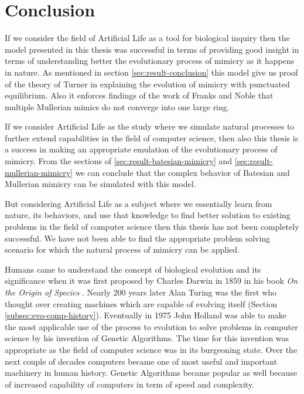\chapter{Conclusion}
If we consider the field of Artificial Life as a tool for biological inquiry then the model presented in this thesis was successful in terms of providing good insight in terms of understanding better the evolutionary process of mimicry as it happens in nature. As mentioned in section \ref{sec:result-conclusion} this model give us proof of the theory of Turner in explaining the evolution of mimicry with punctuated equilibrium. Also it enforces findings of the work of Franks and Noble that multiple Mullerian mimics do not converge into one large ring.

If we consider Artificial Life as the study where we simulate natural processes to further extend capabilities in the field of computer science, then also this thesis is a success in making an appropriate emulation of the evolutionary process of mimicry. From the sections of \ref{sec:result-batesian-mimicry} and \ref{sec:result-mullerian-mimicry} we can conclude that the complex behavior of Batesian and Mullerian mimicry can be simulated with this model.

But considering Artificial Life as a subject where we essentially learn from nature, its behaviors, and use that knowledge to find better solution to existing problems in the field of computer science then this thesis has not been completely successful. We have not been able to find the appropriate problem solving scenario for which the natural process of mimicry can be applied.

Humans came to understand the concept of biological evolution and its significance when it was first proposed by Charles Darwin in 1859 in his book \textsl{On the Origin of Species} \cite{darwin1859}. Nearly 200 years later Alan Turing was the first who thought over creating machines which are capable of evolving itself (Section \ref{subsec:evo-comp-history}). Eventually in 1975 John Holland was able to make the most applicable use of the process to evolution to solve problems in computer science by his invention of Genetic Algorithms. The time for this invention was appropriate as the field of computer science was in its burgeoning state. Over the next couple of decades computers became one of most useful and important machinery in human history. Genetic Algorithms became popular as well because of increased capability of computers in term of speed and complexity.  

